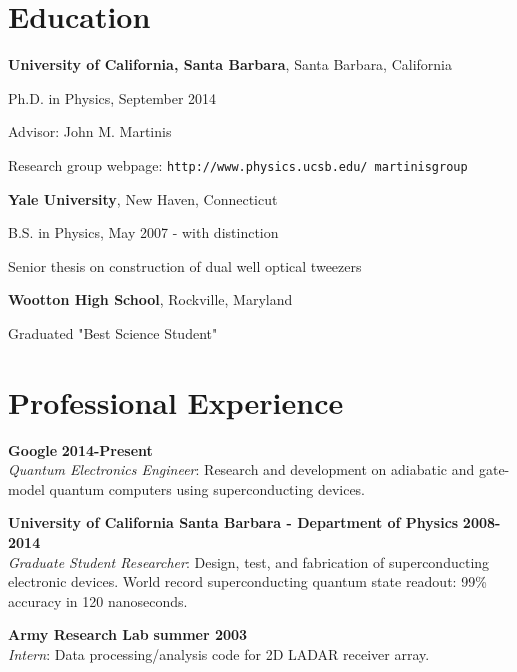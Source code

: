 \documentclass[margin=2cm,line]{res}
\newenvironment{list3}{
  \begin{list}{}{%
      \setlength{\itemsep}{0in}
      \setlength{\parsep}{0in} \setlength{\parskip}{0in}
      \setlength{\topsep}{0in} \setlength{\partopsep}{0in}
      \setlength{\leftmargin}{0.2in}}}{\end{list}}
\newcommand{\education}[2]{
{\bf #1}, #2 \\
\vspace*{-.15in}
}
\newcommand{\job}[4]{
{\bf #1} \hfill {\bf #2}\\
{\em #3}: #4
}
\begin{document}
\address{408 Ellwood Beach Drive \#4 \\ Goleta, CA 93117}
\address{\texttt{sank.daniel@gmail.com}}

\begin{resume}

\section{\sc Education}

\education{University of California, Santa Barbara}{Santa Barbara, California}
\begin{list3}
\item Ph.D. in Physics, September 2014
\item Advisor: John M. Martinis
\item Research group webpage: \texttt{http://www.physics.ucsb.edu/~martinisgroup}
\end{list3}

\education{Yale University}{New Haven, Connecticut}
\begin{list3}
\item B.S. in Physics, May 2007 - with distinction
\item Senior thesis on construction of dual well optical tweezers
\end{list3}

\education{Wootton High School}{Rockville, Maryland}
\begin{list3}
\item Graduated "Best Science Student"
\end{list3}


\section{\sc Professional Experience}

\job
{Google}
{2014-Present}
{Quantum Electronics Engineer}
{Research and development on adiabatic and gate-model quantum computers using superconducting devices.}

\job
{University of California Santa Barbara - Department of Physics}
{2008-2014}
{Graduate Student Researcher}
{Design, test, and fabrication of superconducting electronic devices.
World record superconducting quantum state readout:
99\% accuracy in 120 nanoseconds.}

\job
{Army Research Lab}
{summer 2003}
{Intern}
{Data processing/analysis code for 2D LADAR receiver array.}


\end{resume}
\end{document}
